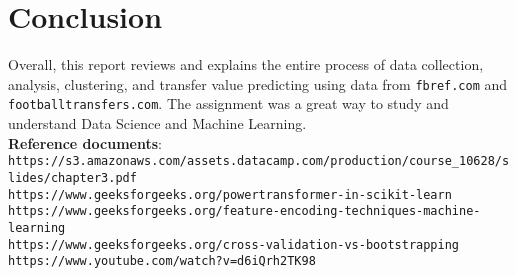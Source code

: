 \documentclass{report}
\begin{document}
\section{Conclusion}
Overall, this report reviews and explains the entire process of data collection, analysis, clustering, and 
transfer value predicting using data from \verb|fbref.com| and \verb|footballtransfers.com|. 
The assignment was a great way to study and understand Data Science and Machine Learning. \\

\textbf{Reference documents}: \\
{\small \verb|https://s3.amazonaws.com/assets.datacamp.com/production/course_10628/slides/chapter3.pdf|} \\
{\small \verb|https://www.geeksforgeeks.org/powertransformer-in-scikit-learn|} \\ 
{\small \verb|https://www.geeksforgeeks.org/feature-encoding-techniques-machine-learning|} \\
{\small \verb|https://www.geeksforgeeks.org/cross-validation-vs-bootstrapping|} \\
{\small \verb|https://www.youtube.com/watch?v=d6iQrh2TK98|} \\
\end{document}
